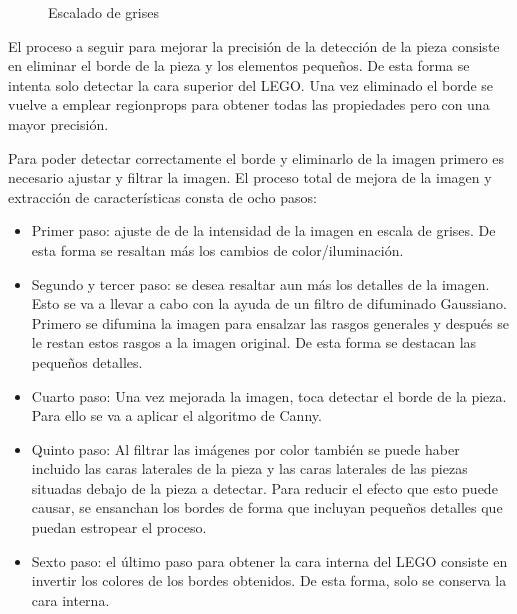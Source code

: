 \begin{figure}[ht]  %
  \hfill	
  \hfill	
\caption{Escalado de grises}
\label{fig:mejora2}
\vspace{-5pt}
\end{figure}

El proceso a seguir para mejorar la precisión de la detección de la pieza consiste en eliminar el borde de la pieza y los elementos pequeños. De esta forma se intenta solo detectar la cara superior del LEGO. Una vez eliminado el borde se vuelve a emplear regionprops para obtener todas las propiedades pero con una mayor precisión.

Para poder detectar correctamente el borde y eliminarlo de la imagen primero es necesario ajustar y filtrar la imagen. El proceso total de mejora de la imagen y extracción de características consta de ocho pasos:

\begin{itemize}
\item Primer paso: ajuste de de la intensidad de la imagen en escala de grises. De esta forma se resaltan más los cambios de color/iluminación.

\item Segundo y tercer paso: se desea resaltar aun más los detalles de la imagen. Esto se va a llevar a cabo con la ayuda de un filtro de difuminado Gaussiano. Primero se difumina la imagen para ensalzar las rasgos generales y después se le restan estos rasgos a la imagen original. De esta forma se destacan las pequeños detalles.

\item Cuarto paso: Una vez mejorada la imagen, toca detectar el borde de la pieza. Para ello se va a aplicar el algoritmo de Canny.

\item Quinto paso: Al filtrar las imágenes por color también se puede haber incluido las caras laterales de la pieza y las caras laterales de las piezas situadas debajo de la pieza a detectar. Para reducir el efecto que esto puede causar, se ensanchan los bordes de forma que incluyan pequeños detalles que puedan estropear el proceso.

\item Sexto paso: el último paso para obtener la cara interna del LEGO consiste en invertir los colores de los bordes obtenidos. De esta forma, solo se conserva la cara interna.
\end{itemize}


